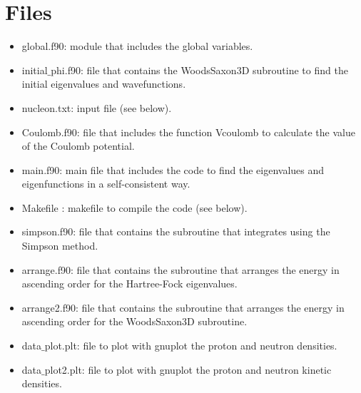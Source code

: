 \documentclass[a4paper,10pt]{article}
\begin{document}
\section{Files}
\begin{itemize}
 \item global.f90: module that includes the global variables.
 \item initial$\_$phi.f90: file that contains the WoodsSaxon3D subroutine to find the initial eigenvalues and wavefunctions.
 \item nucleon.txt: input file (see below).
 \item Coulomb.f90: file that includes the function Vcoulomb to calculate the value of the Coulomb potential. 
 \item main.f90: main file that includes the code to find the eigenvalues and eigenfunctions in a self-consistent way. 
 \item Makefile : makefile to compile the code (see below). 
 \item simpson.f90: file that contains the subroutine that integrates using the Simpson method.
 \item arrange.f90: file that contains the subroutine that arranges the energy in ascending order for the Hartree-Fock eigenvalues. 
  \item arrange2.f90: file that contains the subroutine that arranges the energy in ascending order for the WoodsSaxon3D subroutine. 
 \item data$\_$plot.plt: file to plot with gnuplot the proton and neutron densities. 
 \item data$\_$plot2.plt: file to plot with gnuplot the proton and neutron kinetic densities. 
  \end{itemize}
\end{document}
